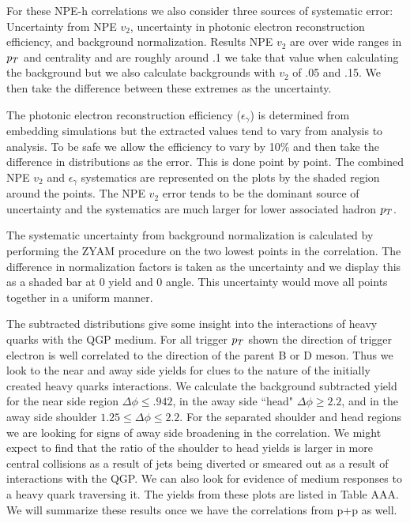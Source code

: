 For these NPE-h correlations we also consider three sources of systematic error: Uncertainty from NPE $v_2$, uncertainty in photonic electron reconstruction efficiency, and background normalization. Results NPE $v_2$ are over wide ranges in $p_{T}$ and centrality and are roughly around .1 we take that value when calculating the background but we also calculate backgrounds with $v_2$ of .05 and .15. We then take the difference between these extremes as the uncertainty. 

The photonic electron reconstruction efficiency ($\epsilon_\gamma$) is determined from embedding simulations but the extracted values tend to vary from analysis to analysis. To be safe we allow the efficiency to vary by 10\% and then take the difference in distributions as the error. This is done point by point. The combined NPE $v_2$ and $\epsilon_\gamma$ systematics are represented on the plots by the shaded region around the points. The NPE $v_2$ error tends to be the dominant source of uncertainty and the systematics are much larger for lower associated hadron $p_{T}$.

The systematic uncertainty from background normalization is calculated by performing the ZYAM procedure on the two lowest points in the correlation. The difference in normalization factors is taken as the uncertainty and we display this as a shaded bar at 0 yield and 0 angle. This uncertainty would move all points together in a uniform manner.

The subtracted distributions give some insight into the interactions of heavy quarks with the QGP medium. For all trigger $p_{T}$ shown the direction of trigger electron is well correlated to the direction of the parent B or D meson. Thus we look to the near and away side yields for clues to the nature of the initially created heavy quarks interactions. We calculate the background subtracted yield for the near side region $\Delta\phi \leq .942$, in the away side ``head" $\Delta\phi \geq 2.2$, and in the away side shoulder $1.25 \leq \Delta\phi \leq 2.2$. For the separated shoulder and head regions we are looking for signs of away side broadening in the correlation. We might expect to find that the ratio of the shoulder to head yields is larger in more central collisions as a result of jets being diverted or smeared out as a result of interactions with the QGP. We can also look for evidence of medium responses to a heavy quark traversing it. The yields from these plots are listed in Table AAA. We will summarize these results once we have the correlations from p+p as well. 

